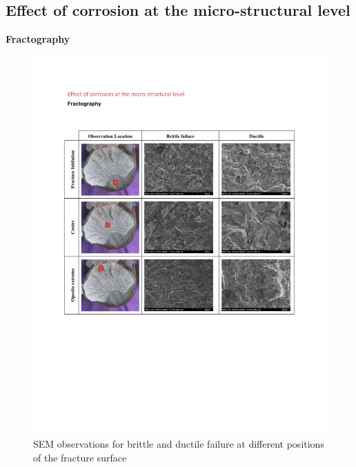 \subsection{Effect of corrosion at the micro-structural level}
\textbf{Fractography}
\begin{figure}[htbp]
	\centering
	\includegraphics[width=1\textwidth]{VAC Thesis 2.0/Chapter-4/figs/BBT_fractography.pdf}
	\caption{SEM observations for brittle and ductile failure at different positions of the fracture surface}
	\label{fig:FractureSurfaces}
\end{figure}
